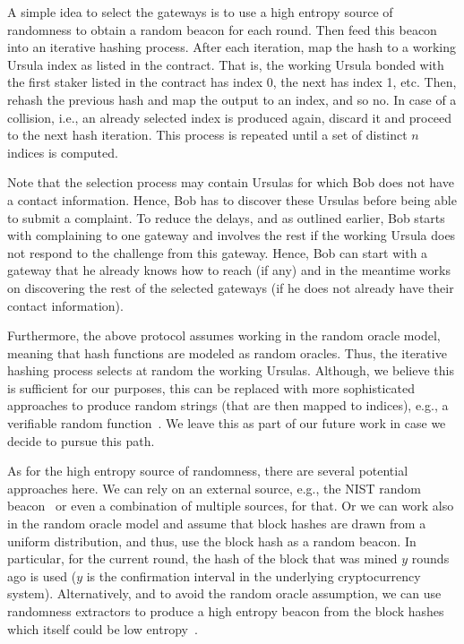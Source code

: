 A simple idea to select the gateways is to use a high entropy source of randomness to obtain a random beacon for each round. Then feed this beacon into an iterative hashing process. After each iteration, map the hash to a working Ursula index as listed in the \stakeescrow contract. That is, the working Ursula bonded with the first staker listed in the contract has index 0, the next has index 1, etc. Then, rehash the previous hash and map the output to an index, and so no. In case of a collision, i.e., an already selected index is produced again, discard it and proceed to the next hash iteration. This process is repeated until a set of distinct $n$ indices is computed. 


Note that the selection process may contain Ursulas for which Bob does not have a contact information. Hence, Bob has to discover these Ursulas before being able to submit a complaint. To reduce the delays, and as outlined earlier, Bob starts with complaining to one gateway and involves the rest if the working Ursula does not respond to the challenge from this gateway. Hence, Bob can start with a gateway that he already knows how to reach (if any) and in the meantime works on discovering the rest of the selected gateways (if he does not already have their contact information).


Furthermore, the above protocol assumes working in the random oracle model, meaning that hash functions are modeled as random oracles. Thus, the iterative hashing process selects at random the working Ursulas. Although, we believe this is sufficient for our purposes, this can be replaced with more sophisticated approaches to produce random strings (that are then mapped to indices), e.g., a verifiable random function~\cite{micali1999verifiable}. We leave this as part of our future work in case we decide to pursue this path. 


As for the high entropy source of randomness, there are several potential approaches here. We can rely on an external source, e.g., the NIST random beacon~\cite{nist-beacon} or even a combination of multiple sources, for that. Or we can work also in the random oracle model and assume that block hashes are drawn from a uniform distribution, and thus, use the block hash as a random beacon. In particular, for the current round, the hash of the block that was mined $y$ rounds ago is used ($y$ is the confirmation interval in the underlying cryptocurrency system). Alternatively, and to avoid the random oracle assumption, we can use randomness extractors to produce a high entropy beacon from the block hashes which itself could be low entropy~\cite{bonneau2015bitcoin}.


